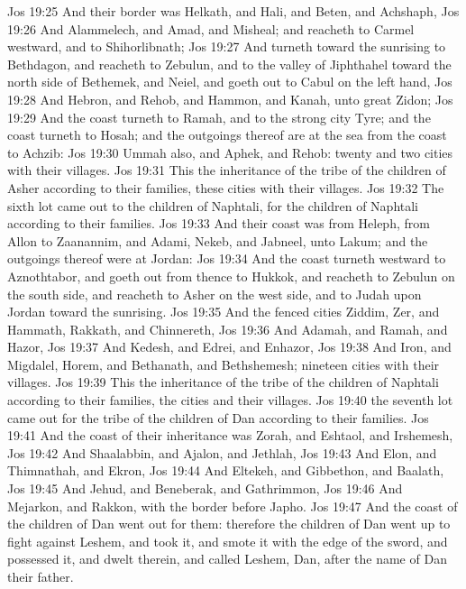 \vs Jos 19:25 And their border was Helkath, and Hali, and Beten, and Achshaph,
\vs Jos 19:26 And Alammelech, and Amad, and Misheal; and reacheth to Carmel westward, and to Shihorlibnath;
\vs Jos 19:27 And turneth toward the sunrising to Bethdagon, and reacheth to Zebulun, and to the valley of Jiphthahel toward the north side of Bethemek, and Neiel, and goeth out to Cabul on the left hand,
\vs Jos 19:28 And Hebron, and Rehob, and Hammon, and Kanah,  unto great Zidon;
\vs Jos 19:29 And  the coast turneth to Ramah, and to the strong city Tyre; and the coast turneth to Hosah; and the outgoings thereof are at the sea from the coast to Achzib:
\vs Jos 19:30 Ummah also, and Aphek, and Rehob: twenty and two cities with their villages.
\vs Jos 19:31 This  the inheritance of the tribe of the children of Asher according to their families, these cities with their villages.
\vs Jos 19:32 The sixth lot came out to the children of Naphtali,  for the children of Naphtali according to their families.
\vs Jos 19:33 And their coast was from Heleph, from Allon to Zaanannim, and Adami, Nekeb, and Jabneel, unto Lakum; and the outgoings thereof were at Jordan:
\vs Jos 19:34 And  the coast turneth westward to Aznothtabor, and goeth out from thence to Hukkok, and reacheth to Zebulun on the south side, and reacheth to Asher on the west side, and to Judah upon Jordan toward the sunrising.
\vs Jos 19:35 And the fenced cities  Ziddim, Zer, and Hammath, Rakkath, and Chinnereth,
\vs Jos 19:36 And Adamah, and Ramah, and Hazor,
\vs Jos 19:37 And Kedesh, and Edrei, and Enhazor,
\vs Jos 19:38 And Iron, and Migdalel, Horem, and Bethanath, and Bethshemesh; nineteen cities with their villages.
\vs Jos 19:39 This  the inheritance of the tribe of the children of Naphtali according to their families, the cities and their villages.
\vs Jos 19:40  the seventh lot came out for the tribe of the children of Dan according to their families.
\vs Jos 19:41 And the coast of their inheritance was Zorah, and Eshtaol, and Irshemesh,
\vs Jos 19:42 And Shaalabbin, and Ajalon, and Jethlah,
\vs Jos 19:43 And Elon, and Thimnathah, and Ekron,
\vs Jos 19:44 And Eltekeh, and Gibbethon, and Baalath,
\vs Jos 19:45 And Jehud, and Beneberak, and Gathrimmon,
\vs Jos 19:46 And Mejarkon, and Rakkon, with the border before Japho.
\vs Jos 19:47 And the coast of the children of Dan went out  for them: therefore the children of Dan went up to fight against Leshem, and took it, and smote it with the edge of the sword, and possessed it, and dwelt therein, and called Leshem, Dan, after the name of Dan their father.
